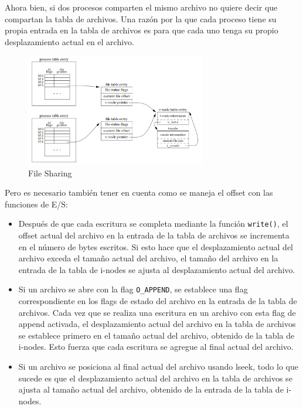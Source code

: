 \documentclass{article}
\begin{document}
Ahora bien, si dos procesos comparten el mismo archivo no quiere decir que compartan la tabla de archivos. Una razón por la que cada proceso tiene su propia entrada en la tabla de archivos es para que cada uno tenga su propio desplazamiento actual en el archivo.

\begin{figure}[h]
    \centering
    \includegraphics[width=0.7\textwidth]{src/filesharing2.png}
    \caption{File Sharing}
\end{figure}

Pero es necesario también tener en cuenta como se maneja el offset con las funciones de E/S:
\begin{itemize}
    \item Después de que cada escritura se completa mediante la función \texttt{write()}, el offset actual del archivo en la entrada de la tabla de archivos se incrementa en el número de bytes escritos. Si esto hace que el desplazamiento actual del archivo exceda el tamaño actual del archivo, el tamaño del archivo en la entrada de la tabla de i-nodes se ajusta al desplazamiento actual del archivo.
    \item Si un archivo se abre con la flag \texttt{O\_APPEND}, se establece una flag correspondiente en los flags de estado del archivo en la entrada de la tabla de archivos. Cada vez que se realiza una escritura en un archivo con esta flag de append activada, el desplazamiento actual del archivo en la tabla de archivos se establece primero en el tamaño actual del archivo, obtenido de la tabla de i-nodes. Esto fuerza que cada escritura se agregue al final actual del archivo.
    \item Si un archivo se posiciona al final actual del archivo usando lseek, todo lo que sucede es que el desplazamiento actual del archivo en la tabla de archivos se ajusta al tamaño actual del archivo, obtenido de la entrada de la tabla de i-nodes. 
\end{itemize}
\end{document}
